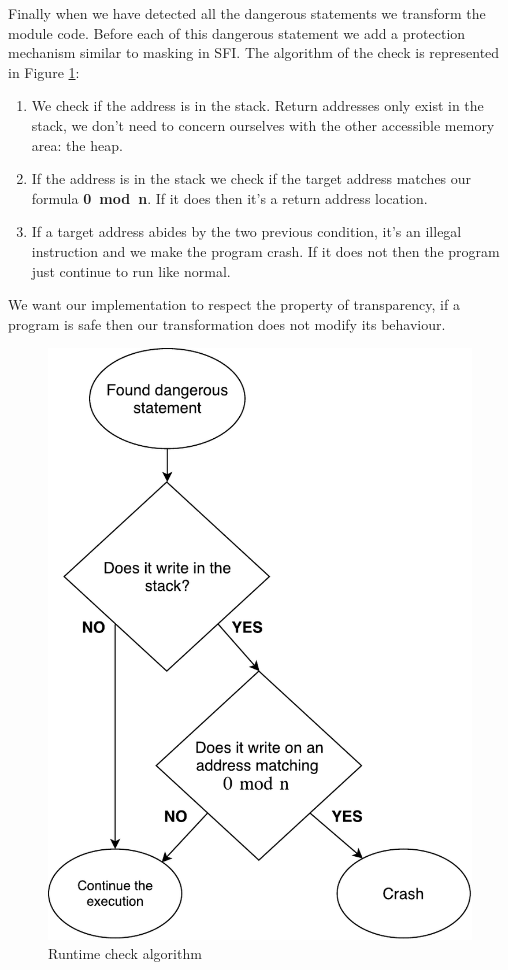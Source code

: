 \documentclass[11pt]{sdm}
\begin{document}
Finally when we have detected all the dangerous statements we transform the module code. Before each of this dangerous statement we add a protection mechanism similar to masking in SFI. The algorithm of the check is represented in Figure \ref{runtime_check}: \\
	\begin{enumerate}
		\item We check if the address is in the stack. Return addresses only exist in the stack, we don't need to concern ourselves with the other accessible memory area: the heap.
		\item If the address is in the stack we check if the target address matches our formula \textbf{0~mod~n}. If it does then it's a return address location.
		\item If a target address abides by the two previous condition, it's an illegal instruction and we make the program crash. If it does not then the program just continue to run like normal.
	\end{enumerate}
We want our implementation to respect the property of transparency, if a program is safe then our transformation does not modify its behaviour.

\begin{figure}[!ht]
\centering
\includegraphics[scale=0.6]{images/runtime_check.pdf}
\caption{Runtime check algorithm}
\label{runtime_check}
\end{figure}
\end{document}
